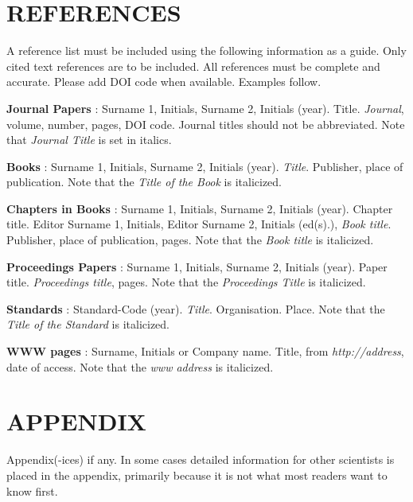 \documentclass[10pt]{JoME}
\begin{document}
\section{REFERENCES}

A reference list must be included using the following information as a guide. Only cited text references are to be included. All references must be complete and accurate. Please add DOI code when available. Examples follow.
 
\textrm{\textbf{Journal Papers}  \cite{bib1}: 
Surname 1, Initials, Surname 2, Initials (year). Title. \textit{Journal}, volume, number, pages, DOI code. Journal titles should not be abbreviated. Note that \textit{Journal Title} is set in italics.} 

\textrm{\textbf{Books} \cite{bib2}: Surname 1, Initials, Surname 2, Initials (year). \textit{Title}. Publisher, place of publication. Note that the \textit{Title of the Book} is italicized.} 

\textrm{\textbf{Chapters in Books} \cite{bib3}:
Surname 1, Initials, Surname 2, Initials (year). Chapter title. Editor Surname 1, Initials, Editor Surname 2, Initials (ed(s).), \textit{Book title}. Publisher, place of publication, pages. Note that the \textit{Book title} is italicized.}

\textrm{\textbf{Proceedings Papers}  \cite{bib4}:
Surname 1, Initials, Surname 2, Initials (year). Paper title. \textit{Proceedings title}, pages. Note that the \textit{Proceedings Title} is italicized.}

\textrm{\textbf{Standards} \cite{bib5}: Standard-Code (year). \textit{Title}. Organisation. Place. Note that the \textit{Title of the Standard} is italicized.}

\textrm{\textbf{WWW pages} \cite{bib6}: 
Surname, Initials or Company name. Title, from \textit{http://address}, date of access. Note that the \textit{www address} is italicized.}
 


{}

\section{APPENDIX}

Appendix(-ices) if any. In some cases detailed information for other scientists is placed in the appendix, primarily because it is not what most readers want to know first.

 
\end{document}
